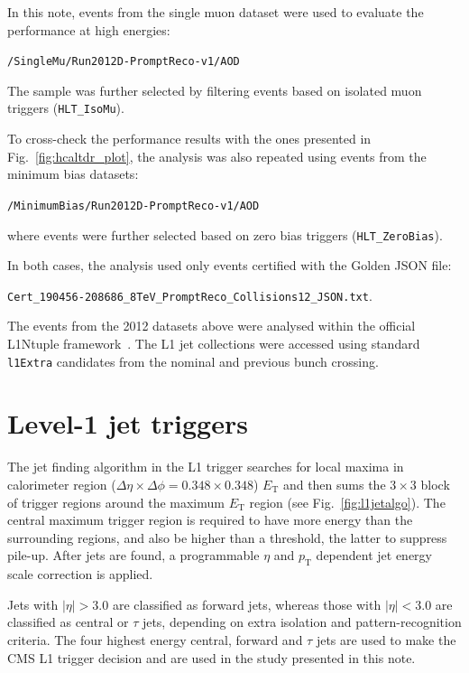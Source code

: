 \documentclass[11pt]{cmspaperpdf}
\newcommand{\pt}{\ensuremath{p_{\mathrm{T}}}\xspace}
\newcommand{\et}{\ensuremath{E_{\textrm{T}}}\xspace}
\begin{document}
In this note, events from the single muon dataset were used to evaluate the performance at high energies:

\texttt{/SingleMu/Run2012D-PromptReco-v1/AOD}

The sample was further selected by filtering events based on isolated muon triggers (\texttt{HLT\_IsoMu}).

To cross-check the performance results with the ones presented in Fig.~\ref{fig:hcaltdr_plot}, the analysis was also repeated using events from the minimum bias datasets:

\texttt{/MinimumBias/Run2012D-PromptReco-v1/AOD}

where events were further selected based on zero bias triggers (\texttt{HLT\_ZeroBias}).

In both cases, the analysis used only events certified with the Golden JSON file:

\texttt{Cert\_190456-208686\_8TeV\_PromptReco\_Collisions12\_JSON.txt}.

The events from the 2012 datasets above were analysed within the official L1Ntuple framework~\cite{l1ntpl}. The L1 jet collections were accessed using standard \texttt{l1Extra} candidates from the nominal and previous bunch crossing.

\section{Level-1 jet triggers}
\label{sec:l1jetalgo}

The jet finding algorithm in the L1 trigger searches for local maxima in calorimeter region ($\Delta \eta \times \Delta \phi =
0.348 \times 0.348$) \et and then sums the $3\times3$ block of trigger regions around the maximum \et region (see
Fig.~\ref{fig:l1jetalgo}). The central maximum trigger region is required to have more energy than the surrounding
regions, and also be higher than a threshold, the latter to suppress pile-up. After jets are found, a programmable $\eta$ and \pt dependent jet energy scale correction is applied.

Jets with $|\eta|>3.0$ are classified as forward jets, whereas those with $|\eta|<3.0$ are classified as central or $\tau$ jets, 
depending on extra isolation and pattern-recognition criteria. The four highest energy central, forward and $\tau$ jets are used to make the CMS L1 trigger decision and are used in the study presented in this note.
\end{document}
